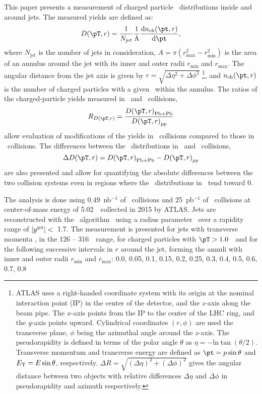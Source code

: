 This paper presents a measurement of charged particle \pt\ distributions inside and around jets. The measured yields are defined as:
  \begin{equation}
  \Dptr = \frac{1}{N_{\mathrm{jet}}} \frac{1}{\mathrm{A}} \frac{\mathrm{d} n_{\mathrm{ch}} (\pt, r)}{\mathrm{d} \pt},
\end{equation}
where $N_{\mathrm{jet}}$ is the number of jets in consideration, $A = \pi (r_{\mathrm{max}}^2 - r_{\mathrm{min}}^2) $ is the area of an annulus around the jet with its inner and outer radii $r_{\mathrm{min}}$ and $r_{\mathrm{max}}$. The angular distance from the jet axis is given by $r = \sqrt{\Delta \eta^2 + \Delta \phi^2}$ \footnote{ATLAS uses a right-handed coordinate system with its origin at the nominal interaction point (IP) in the center of the detector, and the $z$-axis along the beam pipe. The $x$-axis points from the IP to the center of the LHC ring, and the $y$-axis points upward. Cylindrical coordinates $(r, \phi)$ are used the transverse plane, $\phi$ being the azimuthal angle around the $z$-axis. The pseudorapidity is defined in terms of the polar angle $\theta$ as $\eta = - \text{ln} \tan (\theta/2)$. Transverse momentum and transverse energy are defined as $\pt = p \sin\theta$ and $\mbox{$E_{\mathrm{T}}$} = E \sin\theta$, respectively. $\Delta R = \sqrt{(\Delta \eta )^2 + (\Delta \phi)^2}$ gives the angular distance between two objects with relative differences $\Delta \eta$ and $\Delta \phi$ in pseudorapidity and azimuth respectively.}, and $n_{\mathrm{ch}}(\pt, r)$ is the number of charged particles with a given \pt\ within the annulus. The ratios of the charged-particle yields measured in \pbpb\ and \pp\ collisions,
\begin{equation}
   \RDptr = \frac{\Dptr_\mathrm{Pb+Pb}}{\Dptr_{pp}}
   \label{eq:rdptr}
\end{equation}
allow evaluation of modifications of the yields in \pbpb\ collisions compared to those in \pp\ collisions. The differences between the \Dptr\ distributions in \pbpb\ and \pp\ collisions, 
\begin{equation}
   \Delta \Dptr = \Dptr_\mathrm{Pb+Pb} - \Dptr_{pp}
   \label{eq:deltadptr}
\end{equation}
 are also presented and allow for quantifying the absolute differences between the two collision systems even in regions where the \Dptr\ distributions in \pp\ tend toward 0.

The analysis is done using 0.49~nb$^{-1}$ of \pbpb\ collisions and 
25~pb$^{-1}$ of \pp\ collisions at center-of-mass energy of 5.02~\TeV\ collected in 2015 by ATLAS.
Jets are reconstructed with the \antikt\ algorithm~\cite{Cacciari:2008qp} using a radius parameter \RFour\ over a rapidity range of $|\mbox{$y^{\mathrm{jet}}$}| <$~1.7. The measurement is presented for jets with transverse momenta \ptjet, in the 126 -- 316~\GeV\ range, for charged particles with $\pT>1.0$~\GeV\ and for the following successive intervals in $r$ around the jet, forming the annuli with inner and outer radii $r_{\textrm{min}}$ and $r_{\textrm{max}}$: 0.0, 0.05, 0.1, 0.15, 0.2, 0.25, 0.3, 0.4, 0.5, 0.6, 0.7, 0.8

